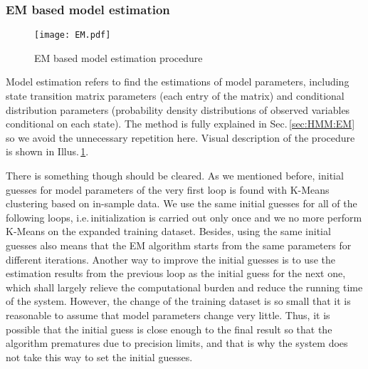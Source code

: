 \subsubsection{EM based model estimation}
\label{sec:system:function:prediction:EM}

		\begin{figure}[!hbt]
	    \center
	    \texttt{[image: EM.pdf]}
	    \caption{EM based model estimation procedure}
	    \label{fig:system:EM}
	    \end{figure}
Model estimation refers to find the estimations of model parameters, 
including state transition matrix parameters (each entry of the matrix) and
conditional distribution parameters 
(probability density distributions of observed variables conditional on each state).
The method is fully explained in Sec.\,\ref{sec:HMM:EM} 
so we avoid the unnecessary repetition here.
Visual description of the procedure is shown in Illus.\,\ref{fig:system:EM}.

There is something though should be cleared.
As we mentioned before, 
initial guesses for model parameters of the very first loop is found 
with K-Means clustering based on in-sample data.
We use the same initial guesses for all of the following loops,
i.e.\,initialization is carried out only once and 
we no more perform K-Means on the expanded training dataset.
Besides, using the same initial guesses also means that 
the EM algorithm starts from the same parameters for different iterations.
Another way to improve the initial guesses is to 
use the estimation results from the previous loop as the initial guess for the next one,
which shall largely relieve the computational burden and reduce the running time of the system.
However, the change of the training dataset is so small that 
it is reasonable to assume that model parameters change very little.
Thus, it is possible that the initial guess is close enough to the final result 
so that the algorithm prematures due to precision limits,
and that is why the system does not take this way to set the initial guesses.


